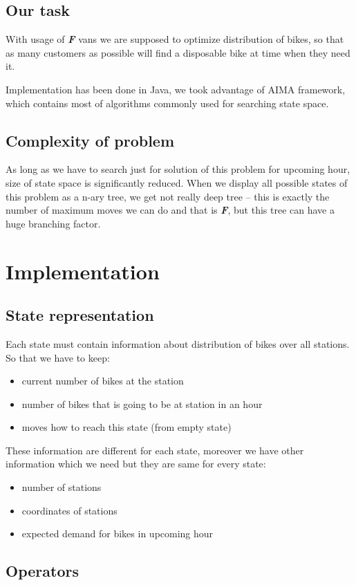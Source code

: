 \documentclass[a4paper,10pt]{report}
\begin{document}
\section{Our task}
With usage of \textbf{\textsl{F}} vans we are supposed to optimize distribution of bikes, so that as many customers as possible will find a disposable bike at time when they need it.

Implementation has been done in Java, we took advantage of AIMA framework\cite{aima}, which contains most of algorithms commonly used for  searching state space.

\section{Complexity of problem}
As long as we have to search just for solution of this problem for upcoming hour, size of state space is significantly reduced. When we display all possible states of this problem as a n-ary tree, we get not really deep tree -- this is exactly the number of maximum moves we can do and that is \textbf{\textsl{F}}, but this tree can have a huge branching factor. 


\chapter{Implementation}
\section{State representation} 
Each state must contain information about distribution of bikes over all stations. So that we have to keep:
\begin{itemize}
\item current number of bikes at the station
\item number of bikes that is going to be at station in an hour 
\item moves how to reach this state (from empty state)
\end{itemize}
These information are different for each state, moreover we have other information which we need but they are same for every state:
\begin{itemize}
 \item number of stations
 \item coordinates of stations
 \item expected demand for bikes in upcoming hour
\end{itemize}


\section{Operators}
\end{document}
